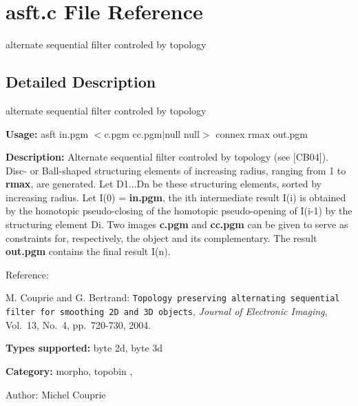 \section{asft.c File Reference}
\label{asft_8c}
alternate sequential filter controled by topology  




\label{_details}
\subsection{Detailed Description}
alternate sequential filter controled by topology 

{\bf Usage:} asft in.pgm $<$c.pgm cc.pgm$|$null null$>$ connex rmax out.pgm

{\bf Description:} Alternate sequential filter controled by topology (see [CB04]). Disc- or Ball-shaped structuring elements of increasing radius, ranging from 1 to {\bf rmax}, are generated. Let D1...Dn be these structuring elements, sorted by increasing radius. Let I(0) = {\bf in.pgm}, the ith intermediate result I(i) is obtained by the homotopic pseudo-closing of the homotopic pseudo-opening of I(i-1) by the structuring element Di. Two images {\bf c.pgm} and {\bf cc.pgm} can be given to serve as constraints for, respectively, the object and its complementary. The result {\bf out.pgm} contains the final result I(n).

Reference:\par
 [CB04] M. Couprie and G. Bertrand: {\tt Topology preserving alternating sequential filter for smoothing 2D and 3D objects}, {\em  Journal of Electronic Imaging\/}, Vol.~13, No.~4, pp.~720-730, 2004.

{\bf Types supported:} byte 2d, byte 3d

{\bf Category:} morpho, topobin ,

\begin{Desc}
\item[Author:]Michel Couprie \end{Desc}

